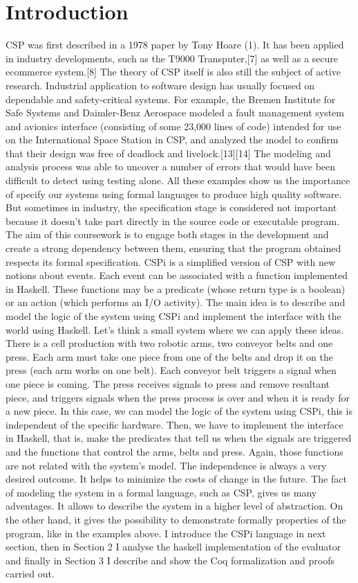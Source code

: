 \documentclass{comjnl}
\begin{document}
\section{Introduction}
CSP was first described in a 1978 paper by Tony Hoare (1). It has been applied in 
industry developments, such as the T9000 Transputer,[7] as well as a secure ecommerce system.[8]
The theory of CSP itself is also still the subject of active research. Industrial application to software design has usually focused on dependable and safety-critical systems. For example, the Bremen Institute for Safe Systems and Daimler-Benz Aerospace modeled a fault management system and avionics interface (consisting of some 23,000 lines of code) intended for use on the International Space Station in CSP, and analyzed the model to confirm that their design was free of deadlock and livelock.[13][14] The modeling and analysis process was able to uncover a number of errors that would have been difficult to detect using testing alone. 
All these examples show us the importance of specify our systems using formal languages to produce high quality software.
But sometimes in industry, the specification stage is considered not important because it doesn't take part directly in the source code or executable program. The aim of this coursework is to engage both stages in the development and create a strong dependency between them, ensuring that the program obtained respects its formal specification.
CSPi is a simplified version of CSP with new notions about events. Each event can be associated with a function implemented in Haskell. These functions 
may be a predicate (whose return type is a boolean) or an action (which performs an I/O activity).
The main idea is to describe and model the logic of the system using CSPi and implement the interface with the world using Haskell. 
Let's think a small system where we can apply these ideas. There is a cell production with two robotic arms, two conveyor belts and one press. Each arm must take one piece from one of the belts and drop it on the press (each arm works on one belt). Each conveyor belt triggers a signal when one piece is coming. The press receives signals to press and remove resultant piece, and triggers signals when the press process is over and when it is ready for a new piece. In this case, we can model the logic of the system using CSPi, this is independent of the specific hardware. Then, we have to implement the interface in Haskell, that is, make the predicates that tell us when the signals are triggered and the functions that control the arms, belts and press. Again, those functions are not related with the system's model. 
The independence is always a very desired outcome. It helps to minimize the costs of change in the future. 
The fact of modeling the system in a formal language, such as CSP, gives us many adventages. It allows to describe the system in a higher level of abstraction. On the other hand, it gives the possibility to demonstrate formally properties of the program, like in the examples above.
I introduce the CSPi language in next section, then in Section 2 I analyse the haskell implementation of the evaluator and finally in Section 3 I describe and show the Coq formalization and proofs carried out.
\end{document}
